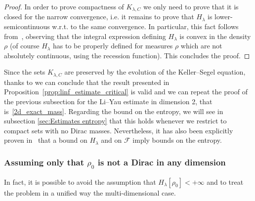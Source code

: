 \documentclass[11pt,a4paper]{article}
\numberwithin{equation}{section}
\newcommand{\R}{{\mathbb{R}}}
\theoremstyle{plain}
\theoremstyle{remark}
\newcommand{\diff}{\mathop{}\!\mathrm{d}}
\begin{document}
\begin{proof}

In order to prove compactness of $K_{\lambda , C}$ we only need to prove that it is closed for the narrow convergence, i.e. it remains to prove that  $H_\lambda$ is lower-semicontinuous w.r.t. to the same convergence. In particular, this fact follows from~\cite{Blanchet_Carlen_Carrillo12}, observing that the integral expression defining $H_\lambda$ is convex in the density $\rho$ (of course $H_\lambda$ has to be properly defined for measures $\rho$ which are not absolutely continuous, using the recession function).
This concludes the proof. 
\end{proof}

Since the sets $K_{\lambda,C}$ are preserved by the evolution of the Keller--Segel equation, thanks to   we can conclude that the result presented in Proposition~\ref{prop:linf_estimate_critical} is valid and we can repeat the proof of the previous subsection for the Li--Yau estimate in dimension 2, that is~\ref{2d_exact_mass}. Regarding the bound on the entropy, we will see in subsection \ref{sec:Estimates entropy} that this holds whenever we restrict to compact sets with no Dirac masses. Nevertheless, it has also been explicitly proven in~\cite{Blanchet_Carlen_Carrillo12} that a bound on $H_\lambda$ and on $\mathcal F$ imply bounds on the entropy. 

\subsubsection{Assuming only that \texorpdfstring{$\rho_{0}$}{rho0} is not a  Dirac in any dimension}

In fact, it is possible to avoid the assumption that $H_{\lambda}[\rho_{0}]<+\infty$ and to treat the problem in a unified way the multi-dimensional case.  
\end{document}
